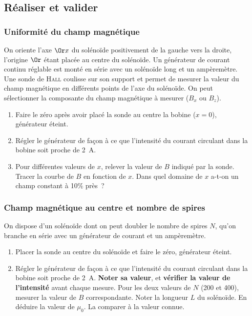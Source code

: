 \documentclass[a4paper, 11pt, final, garamond]{book}
\begin{document}
\subsection{Réaliser et valider}
\label{ssec:solreal}
\subsubsection{Uniformité du champ magnétique}
\label{sssec:soluni}
On oriente l'axe $\Or x$ du solénoïde positivement de la gauche vers la droite,
l'origine $\Or$ étant placée au centre du solénoïde.
\smallbreak
Un générateur de courant continu réglable est monté en série avec un solénoïde
long et un ampèremètre. Une sonde de \textsc{Hall} coulisse sur son support et
permet de mesurer la valeur du champ magnétique en différents points de l'axe du
solénoïde. On peut sélectionner la composante du champ magnétique à mesurer
($B_x$ ou $B_z$).
\begin{enumerate}
  \item Faire le zéro après avoir placé la sonde au centre la bobine ($x=0$),
    générateur éteint.
  \item Régler le générateur de façon à ce que l'intensité du courant circulant
    dans la bobine soit proche de \SI{2}{A}.
  \item Pour différentes valeurs de $x$, relever la valeur de $B$ indiqué par la
    sonde.
  \sqitem[3] Tracer la courbe de $B$ en fonction de $x$. Dans quel domaine de
  $x$ a-t-on un champ constant à 10\% près~?
\end{enumerate}

\subsubsection{Champ magnétique au centre et nombre de spires}
\label{sssec:solnspires}
On dispose d'un solénoïde dont on peut doubler le nombre de spires $N$, qu'on
branche en série avec un générateur de courant et un ampèremètre.
\begin{enumerate}
  \item Placer la sonde au centre du solénoïde et faire le zéro, générateur
    éteint.
  \item Régler le générateur de façon à ce que l'intensité du courant circulant
    dans la bobine soit proche de \SI{2}{A}. \textbf{Noter sa valeur}, et
    \textbf{vérifier la valeur de l'intensité} avant chaque mesure.
  \sqitem[4] Pour les deux valeurs de $N$ (\num{200} et \num{400}), mesurer la
  valeur de $B$ correspondante. Noter la longueur $L$ du solénoïde. En déduire
  la valeur de $\mu_0$. La comparer à la valeur connue.
\end{enumerate}
\end{document}

